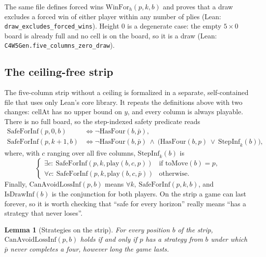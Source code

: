 \documentclass[11pt,a4paper]{article}
\theoremstyle{plain}
\newtheorem{lemma}[theorem]{Lemma}
\theoremstyle{definition}
\newcommand{\code}[1]{{\upshape\texttt{\small\nolinkurl{#1}}}}
\newcommand{\leanref}[1]{(Lean: \code{#1})}
\newcommand{\HasFour}{\mathrm{HasFour}}
\begin{document}
The same file defines forced wins $\mathrm{WinFor}_h(p,k,b)$ and proves that a draw excludes a forced win of either player within any number of plies \leanref{draw_excludes_forced_wins}. Height $0$ is a degenerate case: the empty $5\times 0$ board is already full and no cell is on the board, so it is a draw \leanref{C4W5Gen.five_columns_zero_draw}.

\subsection{The ceiling-free strip}
\label{sec:strip-def}

The five-column strip without a ceiling is formalized in a separate, self-contained file that uses only Lean's core library. It repeats the definitions above with two changes: $\mathrm{cellAt}$ has no upper bound on $y$, and every column is always playable. There is no full board, so the step-indexed safety predicate reads
\begin{align*}
  \mathrm{SafeForInf}(p,0,b) &\iff \neg\HasFour(b,\bar p),\\
  \mathrm{SafeForInf}(p,k{+}1,b) &\iff \neg\HasFour(b,\bar p)\ \wedge\ \bigl(\HasFour(b,p)\ \vee\ \mathrm{StepInf}_k(b)\bigr),
\end{align*}
where, with $c$ ranging over all five columns, $\mathrm{StepInf}_k(b)$ is
\[
  \begin{cases}
    \exists c:\ \mathrm{SafeForInf}(p,k,\mathrm{play}(b,c,p)) & \text{if } \mathrm{toMove}(b)=p,\\
    \forall c:\ \mathrm{SafeForInf}(p,k,\mathrm{play}(b,c,\bar p)) & \text{otherwise}.
  \end{cases}
\]
Finally, $\mathrm{CanAvoidLossInf}(p,b)$ means $\forall k,\ \mathrm{SafeForInf}(p,k,b)$, and $\mathrm{IsDrawInf}(b)$ is the conjunction for both players. On the strip a game can last forever, so it is worth checking that ``safe for every horizon'' really means ``has a strategy that never loses''.

\begin{lemma}[Strategies on the strip]
\label{lem:koenig}
For every position $b$ of the strip, $\mathrm{CanAvoidLossInf}(p,b)$ holds if and only if $p$ has a strategy from $b$ under which $\bar p$ never completes a four, however long the game lasts.
\end{lemma}
\end{document}

